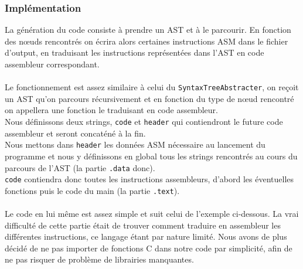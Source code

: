 \documentclass[a4paper,10pt]{article}
\begin{document}
	\subsubsection{Implémentation}
	La génération du code consiste à prendre un AST et à le parcourir. En fonction des nœuds rencontrés on écrira alors certaines instructions ASM dans le fichier d'output, en traduisant les instructions représentées dans l'AST en code assembleur correspondant.\\
	~\\
	Le fonctionnement est assez similaire à celui du \verb?SyntaxTreeAbstracter?, on reçoit un AST qu'on parcours récursivement et en fonction du type de nœud rencontré on appellera une fonction le traduisant en code assembleur.\\
	Nous définissons deux strings, \verb?code? et \verb?header? qui contiendront le future code assembleur et seront concaténé à la fin.\\
	Nous mettons dans \verb?header? les données ASM nécessaire au lancement du programme et nous y définissons en global tous les strings rencontrés au cours du parcours de l'AST (la partie \verb?.data? donc).\\
	\verb?code? contiendra donc toutes les instructions assembleurs, d'abord les éventuelles fonctions puis le code du main (la partie \verb?.text?).\\
	~\\
	Le code en lui même est assez simple et suit celui de l'exemple ci-dessous. La vrai difficulté de cette partie était de trouver comment traduire en assembleur les différentes instructions, ce langage étant par nature limité. Nous avons de plus décidé de ne pas importer de fonctions C dans notre code par simplicité, afin de ne pas risquer de problème de librairies manquantes.\\
\end{document}
